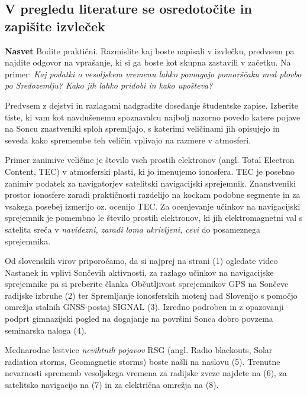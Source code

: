\subsection{V pregledu literature se osredotočite in zapišite izvleček}
\label{subsec:VesVrem_ZapIzvlLit}

\textbf{Nasvet} Bodite praktični. Razmislite kaj boste napisali v izvlečku, predvsem pa najdite odgovor na vprašanje, ki si ga boste kot skupna zastavili v začetku. Na primer: \textit{Kaj podatki o vesoljskem vremenu lahko pomagajo pomorščaku med plovbo po Sredozemlju? Kako jih lahko pridobi in kako upošteva?}

Predvsem z dejstvi in razlagami nadgradite dosedanje študentske zapise. Izberite tiste, ki vam kot navdušenemu spoznavalcu najbolj nazorno povedo katere pojave na Soncu znastveniki sploh spremljajo, s katerimi veličinami jih opisujejo in seveda kako spremembe teh veličin vplivajo na razmere v atmosferi.

Primer zanimive veličine je število vseh prostih elektronov (angl. Total Electron Content, TEC) v atmosferski plasti, ki jo imenujemo ionosfera. TEC je posebno zanimiv podatek za navigatorjev satelitski navigacijski sprejemnik. Znanstveniki prostor ionosfere zaradi praktičnosti razdelijo na kockam podobne segmente in za vsakega posebej izmerijo oz. ocenijo TEC. Za ocenjevanje učinkov na navigacijski sprejemnik je pomembno le število prostih elektronov, ki jih elektromagnetni val s satelita sreča v \textit{navidezni, zaradi loma ukrivljeni, cevi} do posameznega sprejemnika.
   
Od slovenskih virov priporočamo, da si najprej na strani (1) ogledate video Nastanek in vplivi Sončevih aktivnosti, za razlago učinkov na navigacijske sprejemnike pa si preberite članka Občutljivost sprejemnikov GPS na Sončeve radijske izbruhe (2) ter Spremljanje ionosferskih motenj nad Slovenijo s pomočjo omrežja stalnih GNSS-postaj SIGNAL (3). Izredno podroben in z opazovanji podprt gimnazijski pogled na dogajanje na površini Sonca dobro povzema seminarska naloga (4).

Mednarodne lestvice \textit{nevihtnih pojavov} RSG (angl. Radio blackouts, Solar radiation storms, Geomagnetic storms) boste našli na naslovu (5). Trenutne nevarnosti sprememb vesoljskega vremena za radijske zveze najdete na (6), za satelitsko navigacijo na (7) in za električna omrežja na (8).


